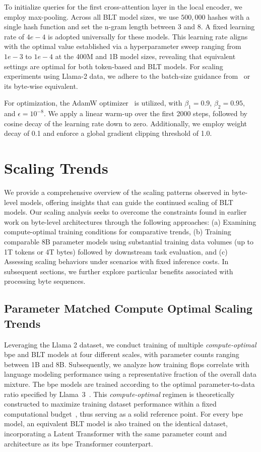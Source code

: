 To initialize queries for the first cross-attention layer in the local encoder, we employ max-pooling. Across all {\textsc BLT} model sizes, we use $500,000$ hashes with a single hash function and set the n-gram length between 3 and 8. A fixed learning rate of $4e-4$ is adopted universally for these models. This learning rate aligns with the optimal value established via a hyperparameter sweep ranging from $1e-3$ to $1e-4$ at the 400M and 1B model sizes, revealing that equivalent settings are optimal for both token-based and {\textsc BLT} models. For scaling experiments using Llama-2 data, we adhere to the batch-size guidance from~\cite{dubey2024llama} or its byte-wise equivalent.

For optimization, the AdamW optimizer~\citep{adamw} is utilized, with $\beta_1=0.9$, $\beta_2=0.95$, and $\epsilon=10^{-8}$. We apply a linear warm-up over the first 2000 steps, followed by cosine decay of the learning rate down to zero. Additionally, we employ weight decay of 0.1 and enforce a global gradient clipping threshold of 1.0.

\section{Scaling Trends}
\label{section:scaling}

We provide a comprehensive overview of the scaling patterns observed in byte-level models, offering insights that can guide the continued scaling of {\textsc BLT} models. Our scaling analysis seeks to overcome the constraints found in earlier work on byte-level architectures through the following approaches: (a) Examining compute-optimal training conditions for comparative trends, (b) Training comparable 8B parameter models using substantial training data volumes (up to 1T tokens or 4T bytes) followed by downstream task evaluation, and (c) Assessing scaling behaviors under scenarios with fixed inference costs. In subsequent sections, we further explore particular benefits associated with processing byte sequences.

\subsection{Parameter Matched Compute Optimal Scaling Trends}
\label{section:parameter-matched-scaling}
Leveraging the Llama 2 dataset, we conduct training of multiple \textit{compute-optimal} bpe and {\textsc BLT} models at four different scales, with parameter counts ranging between 1B and 8B. Subsequently, we analyze how training flops correlate with language modeling performance using a representative fraction of the overall data mixture. The bpe models are trained according to the optimal parameter-to-data ratio specified by Llama~3~\citep{dubey2024llama}. This \textit{compute-optimal} regimen is theoretically constructed to maximize training dataset performance within a fixed computational budget~\citep{hoffmann2022training}, thus serving as a solid reference point. For every bpe model, an equivalent {\textsc BLT} model is also trained on the identical dataset, incorporating a Latent Transformer with the same parameter count and architecture as its bpe Transformer counterpart.

